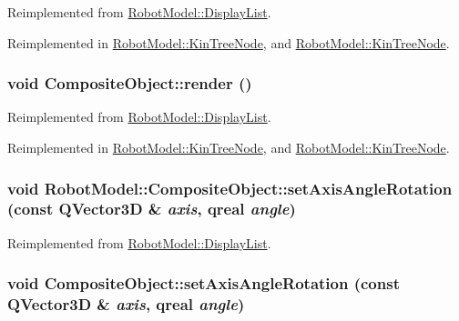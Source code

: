 Reimplemented from \hyperlink{class_robot_model_1_1_display_list_a5f95e85c192a2bc8f06f18075e6fefd7}{RobotModel::DisplayList}.

Reimplemented in \hyperlink{class_robot_model_1_1_kin_tree_node_a85f4364980f9144471b9d92e175c539e}{RobotModel::KinTreeNode}, and \hyperlink{class_robot_model_1_1_kin_tree_node_a7ccf98213f418d0e5efa4f699d898f2d}{RobotModel::KinTreeNode}.\hypertarget{class_robot_model_1_1_composite_object_aee43da74b22f6272736844effe7a1dd6}{
\subsubsection[{render}]{\setlength{\rightskip}{0pt plus 5cm}void CompositeObject::render ()}}
\label{class_robot_model_1_1_composite_object_aee43da74b22f6272736844effe7a1dd6}


Reimplemented from \hyperlink{class_robot_model_1_1_display_list_a5f95e85c192a2bc8f06f18075e6fefd7}{RobotModel::DisplayList}.

Reimplemented in \hyperlink{class_robot_model_1_1_kin_tree_node_a85f4364980f9144471b9d92e175c539e}{RobotModel::KinTreeNode}, and \hyperlink{class_robot_model_1_1_kin_tree_node_a7ccf98213f418d0e5efa4f699d898f2d}{RobotModel::KinTreeNode}.\hypertarget{class_robot_model_1_1_composite_object_a718690c002e0f74b430a75a9c4dfdf85}{
\subsubsection[{setAxisAngleRotation}]{\setlength{\rightskip}{0pt plus 5cm}void RobotModel::CompositeObject::setAxisAngleRotation (const QVector3D \& {\em axis}, \/  qreal {\em angle})}}
\label{class_robot_model_1_1_composite_object_a718690c002e0f74b430a75a9c4dfdf85}


Reimplemented from \hyperlink{class_robot_model_1_1_display_list_a56a652740c494995c0ff55d1a5fd896d}{RobotModel::DisplayList}.\hypertarget{class_robot_model_1_1_composite_object_a43f99ed52def7114d310e29fc6db83f3}{
\subsubsection[{setAxisAngleRotation}]{\setlength{\rightskip}{0pt plus 5cm}void CompositeObject::setAxisAngleRotation (const QVector3D \& {\em axis}, \/  qreal {\em angle})}}
\label{class_robot_model_1_1_composite_object_a43f99ed52def7114d310e29fc6db83f3}


